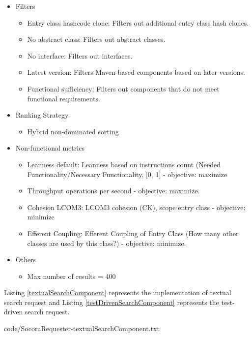 {\begin{itemize}
\item Filters
	\begin{itemize}
	\item Entry class hashcode clone: Filters out additional entry class hash clones.
	\item No abstract class: Filters out abstract classes.
	\item No interface: Filters out interfaces.
	\item Latest version: Filters Maven-based components based on later versions.
	\item Functional sufficiency: Filters out components that do not meet functional requirements.
	\end{itemize}
\item Ranking Strategy
	\begin{itemize}
	\item Hybrid non-dominated sorting
	\end{itemize}
\item Non-functional metrics
	\begin{itemize}
	\item Leanness default: Leanness based on instructions count (Needed Functionality/Necessary Functionality, [0, 1] - objective: maximize
	\item Throughput operations per second - objective: maximize.
	\item Cohesion LCOM3: LCOM3 cohesion (CK), scope entry class - objective: minimize
	\item Efferent Coupling: Efferent Coupling of Entry Class (How many other classes are used by this class?) - objective: minimize.
	\end{itemize}
\item Others
	\begin{itemize}
	\item Max number of results = 400
	\end{itemize}
\end{itemize}

Listing \ref{textualSearchComponent} represents the implementation of textual search request and Listing \ref{testDrivenSearchComponent} represents the test-driven search request.


{code/SocoraRequester-textualSearchComponent.txt}

}
